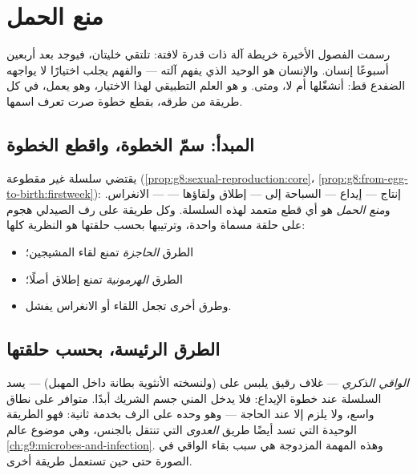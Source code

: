\chapter{منع الحمل}\label{ch:g8:contraception}

رسمت الفصول الأخيرة خريطة آلة ذات قدرة لافتة: تلتقي
خليتان، فيوجد بعد أربعين أسبوعًا إنسان. والإنسان هو 
الوحيد الذي يفهم آلته --- والفهم يجلب اختيارًا لا يواجهه
الضفدع قط: أنشغّلها أم لا، ومتى. و\emph{} هو
العلم التطبيقي لهذا الاختيار، وهو يعمل، في كل طريقة من
طرقه، بقطع خطوة صرت تعرف اسمها.

\section{المبدأ: سمّ الخطوة، واقطع الخطوة}

\begin{proposition}\label{prop:g8:contraception:principle}
يقتضي  سلسلة غير مقطوعة
(\cref{prop:g8:sexual-reproduction:core}،
\cref{prop:g8:from-egg-to-birth:firstweek}): إنتاج
 --- إيداع  --- السباحة إلى  ---
إطلاق  ولقاؤها ---  --- الانغراس.
و\emph{منع الحمل} هو أي قطع متعمد لهذه
السلسلة. وكل طريقة على رف الصيدلي هجوم على حلقة مسماة
واحدة، وترتيبها بحسب حلقتها هو النظرية كلها:
\begin{itemize}
  \item الطرق \emph{الحاجزة} تمنع لقاء المشيجين؛
  \item الطرق \emph{الهرمونية} تمنع إطلاق  أصلًا؛
  \item وطرق أخرى تجعل اللقاء أو الانغراس يفشل.
\end{itemize}
\end{proposition}
\admitted

\section{الطرق الرئيسة، بحسب حلقتها}

\begin{definition}\label{def:g8:contraception:condom}
\emph{الواقي الذكري} --- غلاف رقيق يلبس
على  (ولنسخته الأنثوية بطانة داخل المهبل) --- يسد
السلسلة عند خطوة الإيداع: فلا يدخل المني جسم الشريك
أبدًا. متوافر على نطاق واسع، ولا يلزم إلا عند الحاجة ---
وهو وحده على الرف بخدمة ثانية: فهو الطريقة الوحيدة التي
تسد أيضًا طريق \emph{العدوى} التي تنتقل بالجنس، وهي موضوع
عالم \cref{ch:g9:microbes-and-infection}. وهذه المهمة
المزدوجة هي سبب بقاء الواقي في الصورة حتى حين تستعمل
طريقة أخرى.
\end{definition}

